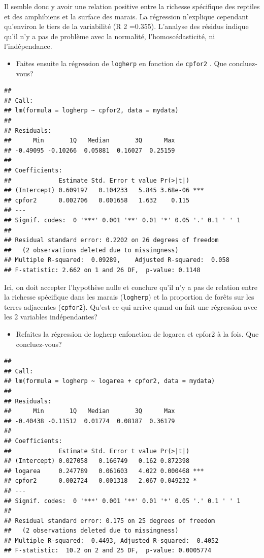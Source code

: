 \documentclass[12pt,]{book}
\providecommand{\tightlist}{%
  \setlength{\itemsep}{0pt}\setlength{\parskip}{0pt}}
\begin{document}
Il semble donc y avoir une relation positive entre la richesse spécifique des reptiles et des amphibiens et la surface des marais. La régression n'explique cependant qu'environ le tiers de la variabilité (R 2 =0.355). L'analyse des résidus indique qu'il n'y a pas de problème avec la normalité, l'homoscédasticité, ni l'indépendance.

\begin{itemize}
\tightlist
\item
  Faites ensuite la régression de \texttt{logherp} en fonction de \texttt{cpfor2} . Que concluez-vous?
\end{itemize}

\begin{verbatim}
## 
## Call:
## lm(formula = logherp ~ cpfor2, data = mydata)
## 
## Residuals:
##      Min       1Q   Median       3Q      Max 
## -0.49095 -0.10266  0.05881  0.16027  0.25159 
## 
## Coefficients:
##             Estimate Std. Error t value Pr(>|t|)    
## (Intercept) 0.609197   0.104233   5.845 3.68e-06 ***
## cpfor2      0.002706   0.001658   1.632    0.115    
## ---
## Signif. codes:  0 '***' 0.001 '**' 0.01 '*' 0.05 '.' 0.1 ' ' 1
## 
## Residual standard error: 0.2202 on 26 degrees of freedom
##   (2 observations deleted due to missingness)
## Multiple R-squared:  0.09289,    Adjusted R-squared:  0.058 
## F-statistic: 2.662 on 1 and 26 DF,  p-value: 0.1148
\end{verbatim}

Ici, on doit accepter l'hypothèse nulle et conclure qu'il n'y a pas de relation entre la richesse spécifique dans les marais (\texttt{logherp}) et la proportion de forêts sur les terres adjacentes (\texttt{cpfor2}). Qu'est-ce qui arrive quand on fait une régression avec les 2 variables indépendantes?

\begin{itemize}
\tightlist
\item
  Refaites la régression de logherp enfonction de logarea et cpfor2 à la fois. Que concluez-vous?
\end{itemize}

\begin{verbatim}
## 
## Call:
## lm(formula = logherp ~ logarea + cpfor2, data = mydata)
## 
## Residuals:
##      Min       1Q   Median       3Q      Max 
## -0.40438 -0.11512  0.01774  0.08187  0.36179 
## 
## Coefficients:
##             Estimate Std. Error t value Pr(>|t|)    
## (Intercept) 0.027058   0.166749   0.162 0.872398    
## logarea     0.247789   0.061603   4.022 0.000468 ***
## cpfor2      0.002724   0.001318   2.067 0.049232 *  
## ---
## Signif. codes:  0 '***' 0.001 '**' 0.01 '*' 0.05 '.' 0.1 ' ' 1
## 
## Residual standard error: 0.175 on 25 degrees of freedom
##   (2 observations deleted due to missingness)
## Multiple R-squared:  0.4493, Adjusted R-squared:  0.4052 
## F-statistic:  10.2 on 2 and 25 DF,  p-value: 0.0005774
\end{verbatim}
\end{document}
